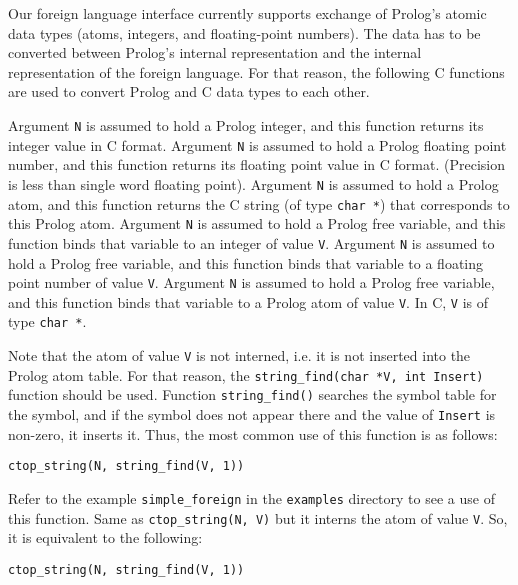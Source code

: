 Our foreign language interface currently supports exchange of Prolog's 
atomic data types (atoms, integers, and floating-point numbers).  The data 
has to be converted between Prolog's internal representation and the internal 
representation of the foreign language.  For that reason, the following 
C functions are used to convert Prolog and C data types to each other.
\begin{description}
        Argument {\tt N} is assumed to hold a Prolog integer, and this
        function returns its integer value in C format.
        Argument {\tt N} is assumed to hold a Prolog floating point number,
        and this function returns its floating point value in C format.
	(Precision is less than single word floating point).
        Argument {\tt N} is assumed to hold a Prolog atom, and this
        function returns the C string (of type {\tt char *}) that 
	corresponds to this Prolog atom.
        Argument {\tt N} is assumed to hold a Prolog free variable, and
        this function binds that variable to an integer of value {\tt V}.
        Argument {\tt N} is assumed to hold a Prolog free variable, and
        this function binds that variable to a floating point number of 
	value {\tt V}.
        Argument {\tt N} is assumed to hold a Prolog free variable, and
        this function binds that variable to a Prolog atom of value {\tt V}.
	In C, {\tt V} is of type {\tt char *}.

	Note that the atom of value {\tt V} is not interned, i.e. it is 
	not inserted into the Prolog atom table.  For that reason, the
	{\tt string\_find(char *V, int Insert)} function should be used.
        Function {\tt string\_find()} searches the symbol table for
	the symbol, and if the symbol does not appear there and the
	value of {\tt Insert} is non-zero, it inserts it.  Thus, the most
	common use of this function is as follows:
	\begin{center}
	{\tt	ctop\_string(N, string\_find(V, 1))	}
	\end{center}
	Refer to the example {\tt simple\_foreign} in the {\tt examples}
	directory to see a use of this function.
	Same as {\tt ctop\_string(N, V)} but it interns the atom of
	value {\tt V}.  So, it is equivalent to the following:
	\begin{center}
	{\tt	ctop\_string(N, string\_find(V, 1))	}
	\end{center}
\end{description}
